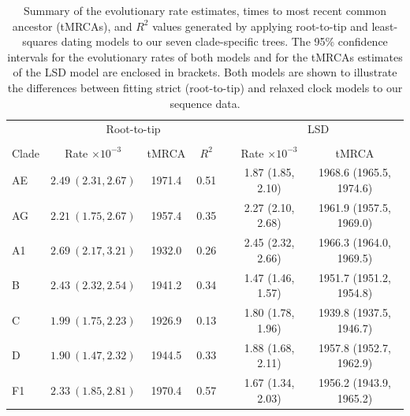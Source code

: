\documentclass[12pt]{article}
\begin{document}
\begin{table}[htbp]
	\centering
	\begin{tabular}{lcccccc}
  	\hline
     & \multicolumn{3}{c}{Root-to-tip} && \multicolumn{2}{c}{LSD}\\
     \cline{1-4}\cline{6-7}\\
 	 Clade & Rate $\times 10^{-3}$ & tMRCA & $R^2$ & &Rate $\times 10^{-3}$ & tMRCA\\ 
 	 \cline{1-4}\cline{6-7}
	 AE & $2.49~ (2.31, 2.67)$ & 1971.4 & 0.51 && 1.87 (1.85, 2.10) & 1968.6 (1965.5, 1974.6)\\ 
 	 AG & $2.21~ (1.75, 2.67)$ & 1957.4 & 0.35 & &2.27 (2.10, 2.68) & 1961.9 (1957.5, 1969.0)\\ 
	A1 & $2.69~ (2.17, 3.21)$ & 1932.0 & 0.26 && 2.45 (2.32, 2.66) & 1966.3 (1964.0, 1969.5)\\ 
  	B & $2.43~ (2.32, 2.54)$ & 1941.2 & 0.34 & &1.47 (1.46, 1.57) & 1951.7 (1951.2, 1954.8)\\ 
  	C & $1.99~ (1.75, 2.23)$ & 1926.9 & 0.13 & &1.80 (1.78, 1.96) & 1939.8 (1937.5, 1946.7) \\ 
    D & $1.90~ (1.47, 2.32)$ & 1944.5 & 0.33 & &1.88 (1.68, 2.11)& 1957.8 (1952.7, 1962.9)\\ 
  	F1 & $2.33~ (1.85, 2.81)$ & 1970.4 & 0.57 & &1.67 (1.34, 2.03) & 1956.2 (1943.9, 1965.2)\\ 
   	\hline
	\end{tabular}
    \caption{Summary of the evolutionary rate estimates, times to most recent common ancestor (tMRCAs), and $R^2$ values generated by applying root-to-tip and least-squares dating models to our seven clade-specific trees. 
    The 95\% confidence intervals for the evolutionary rates of both models and for the tMRCAs estimates of the LSD model are enclosed in brackets.
    Both models are shown to illustrate the differences between fitting strict (root-to-tip) and relaxed clock models to our sequence data. 
    }
    \label{tab:xint}
\end{table}
\end{document}
